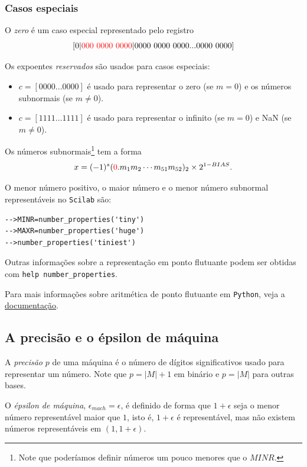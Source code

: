 \subsubsection{Casos especiais}
O \emph{zero} é um caso especial representado pelo registro 
$$
[0|{\color{red}{000~0000~0000}} |0000~0000~0000...0000~0000]
$$




Os expoentes \emph{reservados} são usados para casos especiais:
\begin{itemize}
 \item $c=[0000...0000]$ é usado para representar o zero (se $m=0$) e os números subnormais (se $m\neq 0$).
 \item $c=[1111...1111]$ é usado para representar o infinito (se $m=0$) e NaN (se $m\neq 0$).
\end{itemize}

Os números subnormais\footnote{Note que poderíamos definir números um pouco menores que o $MINR$.} tem a forma
$$ x=(-1)^{s}({\color{red}{0}}.m_{1}m_{2}\cdots m_{51}m_{52})_2 \times 2^{1-BIAS}.$$

\ifisscilab
\begin{obs}
  O menor número positivo, o maior número e o menor número subnormal representáveis  no \verb+Scilab+ são:
\begin{verbatim}
-->MINR=number_properties('tiny')
-->MAXR=number_properties('huge')
-->number_properties('tiniest')
\end{verbatim}
Outras informações sobre a representação em ponto flutuante podem ser obtidas com \verb+help number_properties+.
\end{obs}
\fi
\ifispython
Para mais informações sobre aritmética de ponto flutuante em \verb+Python+, veja a \href{https://docs.python.org/3/tutorial/floatingpoint.html?highlight=double}{documentação}.
\fi

\subsection{A precisão e o épsilon de máquina}

A \emph{precisão} $p$ de uma máquina é o número de dígitos significativos usado para representar um número. Note que $p=|M|+1$ em binário e $p=|M|$ para outras bases.

O \emph{épsilon de máquina}, $\epsilon_{mach}=\epsilon$, é definido de forma que $1+\epsilon$ seja o menor número representável maior que $1$, isto é, $1+\epsilon$ é representável, mas não existem números representáveis em $(1, 1+\epsilon)$.

